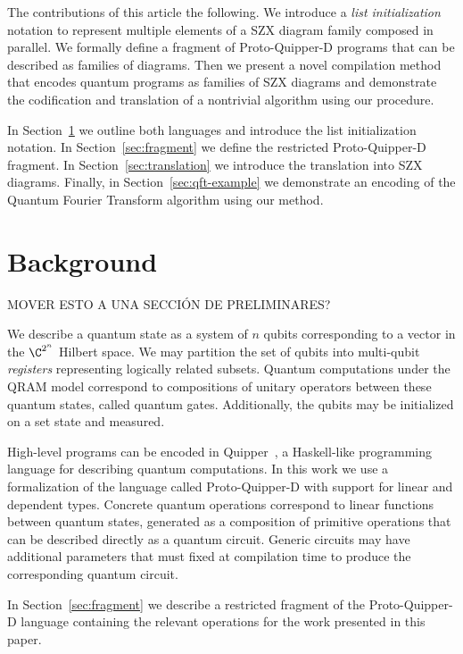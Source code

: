The contributions of this article the following. We introduce a \textit{list initialization} notation to represent multiple elements of a SZX diagram family composed in parallel. We formally define a fragment of Proto-Quipper-D programs that can be described as families of diagrams. Then we present a novel compilation method that encodes quantum programs as families of SZX diagrams and demonstrate the codification and translation of a nontrivial algorithm using our procedure.

In Section~\ref{sec:background} we outline both languages and introduce the list initialization notation. In Section~\ref{sec:fragment} we define the restricted Proto-Quipper-D fragment. In Section~\ref{sec:translation} we introduce the translation into SZX diagrams. Finally, in Section~\ref{sec:qft-example} we demonstrate an encoding of the Quantum Fourier Transform algorithm using our method.

\section{Background}%
\label{sec:background}

{\color{red} MOVER ESTO A UNA SECCIÓN DE PRELIMINARES?}

We describe a quantum state as a system of $n$ qubits corresponding to a vector in the $\C^{2^n}$ Hilbert space. We may partition the set of qubits into multi-qubit \textit{registers} representing logically related subsets. Quantum computations under the QRAM model correspond to compositions of unitary operators between these quantum states, called quantum gates. Additionally, the qubits may be initialized on a set state and measured.

High-level programs can be encoded in Quipper~\cite{Green2013quipper}, a Haskell-like programming language for describing quantum computations. In this work we use a formalization of the language called Proto-Quipper-D\cite{fu_tutorial_2020} with support for linear and dependent types. Concrete quantum operations correspond to linear functions between quantum states, generated as a composition of primitive operations that can be described directly as a quantum circuit. Generic circuits may have additional parameters that must fixed at compilation time to produce the corresponding quantum circuit.

In Section~\ref{sec:fragment} we describe a restricted fragment of the Proto-Quipper-D language containing the relevant operations for the work presented in this paper.
